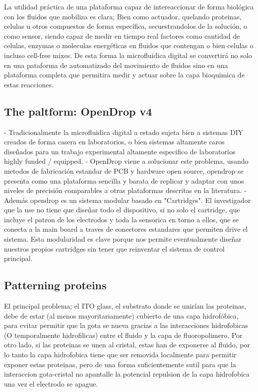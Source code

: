 \documentclass[12pt]{article}
\begin{document}
La utilidad práctica de una plataforma capaz de intereaccionar de forma biológica con los fluidos que mobiliza es clara; Bien como actuador, quelando proteinas, celulas u otros compuestos de forma específica, secuestrandolos de la solución, o como sensor, siendo capaz de medir en tiempo real factores como cantidad de celulas, enzymas o moleculas energéticas en fluidos que contengan o bien celulas o incluso cell-free mixes. De esta forma la microfluidica digital se convertirá no solo en una pataforma de automatizado del movimiento de fluidos sino en una plataforma completa que permitira medir y actuar sobre la capa bioquimica de estas reacciones.


\subsection*{The paltform: OpenDrop v4}
- Tradicionalmente la microfluidica digital a estado sujeta bien a sistemas DIY creados de forma casera en laboratorios, o bien sistemas altamente caros diseñados para un trabajo experimental altamente especifico de laboratorios highly funded / equipped. 
- OpenDrop viene a solucionar este problema, usando metodos de fabricación estandar de PCB y hardware open source, opendrop se presenta como una plataforma sencilla y barata de replicar y adaptar con unos niveles de precisión comparables a otras plataformas descritas en la literatura.
- Además opendrop es un sistema modular basado en "Cartridges". El investigador que la use no tiene que diseñar todo el dispositivo, si no solo el cartridge, que incluye el patron de los electrodos y toda la sensorica en torno a ellos, que se conecta a la main board a traves de conectores estandares que permiten drive el sistema. Esta modularidad es clave porque nos permite eventualmente diseñar nuestros propios cartridges sin tener que reinventar el sistema de control principal.

\subsection*{Patterning proteins}
El principal problema; el ITO glass, el substrato donde se unirían las proteinas, debe de estar (al menos mayoritariamente) cubierto de una capa hidrofóbica, para evitar permitir que la gota se nueva gracias a las interacciones hidrofobicas (O temporalmente hidrofilicas) entre el fluido y la capa de fluoropolimero. Por otro lado, si las proteinas se unen al cristal, estas han de exponerse al fluido, por lo tanto la capa hidrofobica tiene que ser removida localmente para permitir exponer estas proteinas, pero de una forma suficientemente sutil para que la interaccion gota-cristal no apantalle la potencial repulsion de la capa hidrofobica una vez el electrodo se apague.
\end{document}
